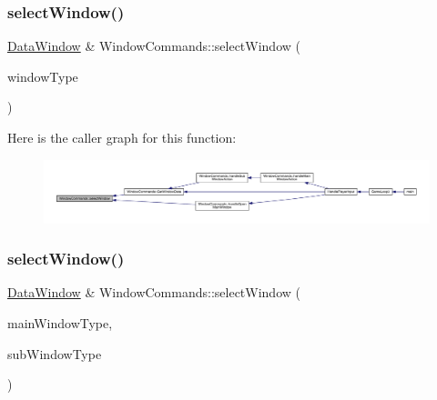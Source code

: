 \subsubsection{\texorpdfstring{select\+Window()}{selectWindow()}\hspace{0.1cm}{\footnotesize\ttfamily [1/2]}}
{\footnotesize\ttfamily \mbox{\hyperlink{class_data_window}{Data\+Window}} \& Window\+Commands\+::select\+Window (\begin{DoxyParamCaption}\item[{\mbox{\hyperlink{_data_window_8hpp_a3c1e0c6fe947fdbea7502497b27cf44d}{En\+Data\+Window\+Type}}}]{window\+Type }\end{DoxyParamCaption})}

Here is the caller graph for this function\+:
\nopagebreak
\begin{figure}[H]
\begin{center}
\leavevmode
\includegraphics[width=350pt]{da/d07/class_window_commands_a4a688b109ea4eff83b5ae43bb1f93e50_icgraph}
\end{center}
\end{figure}
\mbox{\label{class_window_commands_a0e61beaebffb12c489ee277b84f74248}} 
\subsubsection{\texorpdfstring{select\+Window()}{selectWindow()}\hspace{0.1cm}{\footnotesize\ttfamily [2/2]}}
{\footnotesize\ttfamily \mbox{\hyperlink{class_data_window}{Data\+Window}} \& Window\+Commands\+::select\+Window (\begin{DoxyParamCaption}\item[{\mbox{\hyperlink{_data_window_8hpp_a3c1e0c6fe947fdbea7502497b27cf44d}{En\+Data\+Window\+Type}}}]{main\+Window\+Type,  }\item[{\mbox{\hyperlink{_data_window_8hpp_a3c1e0c6fe947fdbea7502497b27cf44d}{En\+Data\+Window\+Type}}}]{sub\+Window\+Type }\end{DoxyParamCaption})}


